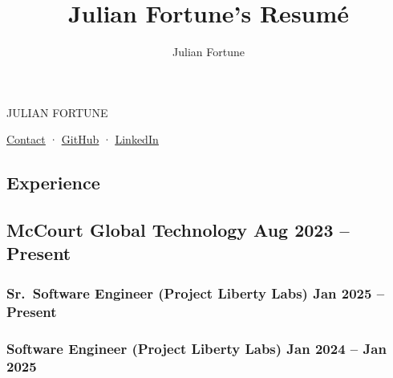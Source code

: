 \documentclass[10pt]{article} %
\title{Julian Fortune's Resumé}
\author{Julian Fortune}
\let\defaultref\href
\renewcommand{\href}[2]{%
  \defaultref{#1}{\ul{#2}}%
}
\newcommand{\link}[2]{\href{#1}{#2}}
\def\separator{ · {}}
\begin{document}
\begin{bfseries}\begin{huge}
  {\selectfont%
    \MakeTextUppercase{Julian Fortune}
  }
\end{huge}\end{bfseries}

  \link{https://forms.gle/KkSirNbEgQozTH2x7}{Contact}\separator%
    \link{http://github.com/julianfortune}{GitHub}\separator%
\link{http://linkedin.com/in/julianfortune}{LinkedIn}%


\begin{paracol}{2}
\setlength{\columnsep}{1em}

\hypertarget{experience}{%
\section{Experience}\label{experience}}

\hypertarget{mccourt-global-technology-aug-2023-present}{%
\subsection{\texorpdfstring{McCourt Global Technology \hfill \small Aug
2023 --
Present}{McCourt Global Technology Aug 2023 -- Present}}\label{mccourt-global-technology-aug-2023-present}}

\vspace{-3pt}

\hypertarget{sr.-software-engineer-project-liberty-labs-jan-2025-present}{%
\subsubsection{\texorpdfstring{\small Sr.~Software Engineer (Project
Liberty Labs) \hfill \small Jan 2025 --
Present}{Sr.~Software Engineer (Project Liberty Labs) Jan 2025 -- Present}}\label{sr.-software-engineer-project-liberty-labs-jan-2025-present}}

\vspace{-3pt}

\hypertarget{software-engineer-project-liberty-labs-jan-2024-jan-2025}{%
\subsubsection{\texorpdfstring{\small Software Engineer (Project Liberty
Labs) \hfill \small Jan 2024 -- Jan
2025}{Software Engineer (Project Liberty Labs) Jan 2024 -- Jan 2025}}\label{software-engineer-project-liberty-labs-jan-2024-jan-2025}}


\end{paracol}
\end{document}
